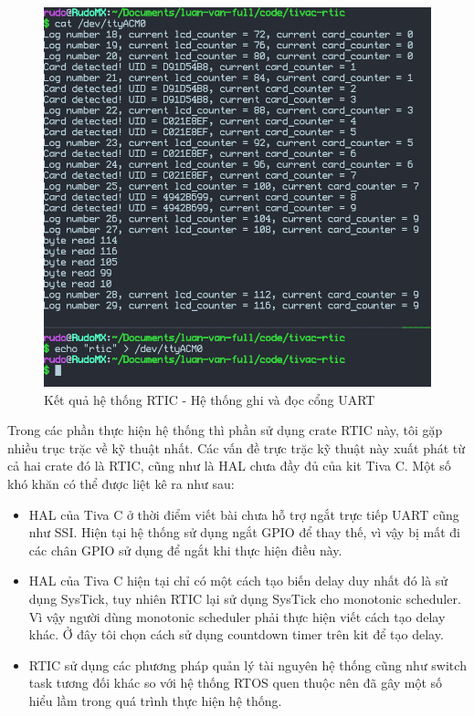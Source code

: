 \begin{figure}[ht]
\centering
\includegraphics[scale=0.5]{images/rtic_uart.png}
\caption{Kết quả hệ thống RTIC - Hệ thống ghi và đọc cổng UART}
\label{fig:rtic_uart}
\end{figure}

\clearpage
Trong các phần thực hiện hệ thống thì phần sử dụng crate RTIC này, tôi gặp nhiều trục trặc về kỹ thuật nhất.
Các vấn đề trực trặc kỹ thuật này xuất phát từ cả hai crate đó là RTIC, cũng như là HAL chưa đầy đủ của kit Tiva C.
Một số khó khăn có thể được liệt kê ra như sau:
\begin{itemize}
    \item HAL của Tiva C ở thời điểm viết bài chưa hỗ trợ ngắt trực tiếp UART cũng như SSI.
        Hiện tại hệ thống sử dụng ngắt GPIO để thay thế, vì vậy bị mất đi các chân GPIO sử dụng để ngắt khi thực hiện điều này.
    \item HAL của Tiva C hiện tại chỉ có một cách tạo biến delay duy nhất đó là sử dụng SysTick, tuy nhiên RTIC lại sử dụng SysTick cho monotonic scheduler.
        Vì vậy người dùng monotonic scheduler phải thực hiện viết cách tạo delay khác.
        Ở đây tôi chọn cách sử dụng countdown timer trên kit để tạo delay.
    \item RTIC sử dụng các phương pháp quản lý tài nguyên hệ thống cũng như switch task tương đối khác so với hệ thống RTOS quen thuộc nên đã gây một số hiểu lầm trong quá trình thực hiện hệ thống.
\end{itemize}

